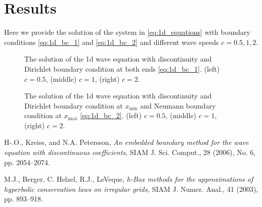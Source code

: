 \documentclass[10pt,a4paper,twoside, french]{article}
\numberwithin{equation}{section}
\numberwithin{figure}{section}
\numberwithin{table}{section}
\begin{document}
{
\centering
\vspace{.5cm}
\begin{minipage}[c]{0.7\textwidth}
\end{minipage}
\label{fig:1d_interp}
}

\newpage
\section{Results}
Here we provide the solution of the system in \eqref{eq:1d_equations} with boundary conditions \eqref{eq:1d_bc_1} and \eqref{eq:1d_bc_2} and different wave speeds $c=0.5,1,2$. 

\begin{figure}[ht!]
\centering
{}
\caption{The solution of the 1d wave equation with discontinuity and Dirichlet boundary condition at both ends \eqref{eq:1d_bc_1}. (left) $c=0.5$, (middle) $c=1$, (right) $c=2$.}
\end{figure}

\begin{figure}[ht!]
\centering
{}
\caption{The solution of the 1d wave equation with discontinuity and Dirichlet boundary condition at $x_{\min}$ and Neumann boundary condition at $x_{\max}$ \eqref{eq:1d_bc_2}. (left) $c=0.5$, (middle) $c=1$, (right) $c=2$.}
\end{figure}

\begin{thebibliography}{0}

H-.O., Kreiss, and N.A. Petersson,
\emph{An embedded boundary method for the wave equation with discontinuous coefficients},
SIAM J. Sci. Comput., 28 (2006), No. 6, pp. 2054--2074.

M.J., Berger, C. Helzel, R.J., LeVeque,
\emph{h-Box methods for the approximations of hyperbolic conservation laws on irregular grids,}
SIAM J. Numer. Anal., 41 (2003), pp. 893--918.


\end{thebibliography}	
	
\end{document}
